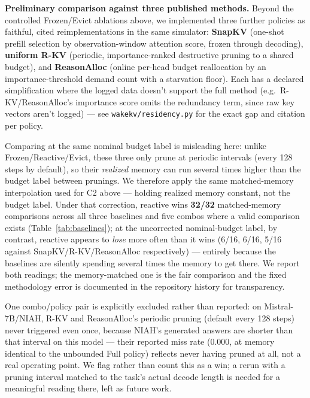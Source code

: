 \documentclass[11pt]{article}
\begin{document}
\textbf{Preliminary comparison against three published methods.} Beyond
the controlled Frozen/Evict ablations above, we implemented three
further policies as faithful, cited reimplementations in the same
simulator: \textbf{SnapKV} \cite{snapkv} (one-shot prefill selection by
observation-window attention score, frozen through decoding),
\textbf{uniform R-KV} \cite{rkv} (periodic, importance-ranked
destructive pruning to a shared budget), and \textbf{ReasonAlloc}
\cite{reasonalloc} (online per-head budget reallocation by an
importance-threshold demand count with a starvation floor). Each has a
declared simplification where the logged data doesn't support the full
method (e.g.\ R-KV/ReasonAlloc's importance score omits the redundancy
term, since raw key vectors aren't logged) --- see
\texttt{wakekv/residency.py} for the exact gap and citation per policy.

Comparing at the same nominal budget label is misleading here: unlike
Frozen/Reactive/Evict, these three only prune at periodic intervals
(every 128 steps by default), so their \emph{realized} memory can run
several times higher than the budget label between prunings. We
therefore apply the same matched-memory interpolation used for C2 above
--- holding realized memory constant, not the budget label. Under that
correction, reactive wins \textbf{32/32} matched-memory comparisons
across all three baselines and five combos where a valid comparison
exists (Table~\ref{tab:baselines}); at the uncorrected nominal-budget
label, by contrast, reactive appears to \emph{lose} more often than it
wins (6/16, 6/16, 5/16 against SnapKV/R-KV/ReasonAlloc respectively) ---
entirely because the baselines are silently spending several times the
memory to get there. We report both readings; the memory-matched one is
the fair comparison and the fixed methodology error is documented in the
repository history for transparency.

One combo/policy pair is explicitly excluded rather than reported: on
Mistral-7B/NIAH, R-KV and ReasonAlloc's periodic pruning (default every
128 steps) never triggered even once, because NIAH's generated answers
are shorter than that interval on this model --- their reported miss
rate (0.000, at memory identical to the unbounded Full policy) reflects
never having pruned at all, not a real operating point. We flag rather
than count this as a win; a rerun with a pruning interval matched to the
task's actual decode length is needed for a meaningful reading there,
left as future work.
\end{document}
